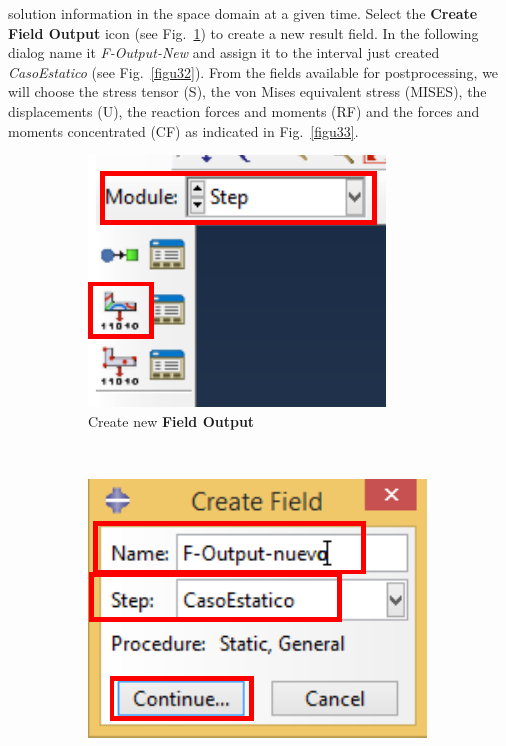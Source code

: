 \begin{enumerate}
  solution information in the space domain at a given time. Select the
  \textbf{Create Field Output} icon (see Fig.~\ref{figu31}) to create
  a new result field. In the following dialog name it
  \textit{F-Output-New} and assign it to the interval just created
  \textit{CasoEstatico} (see Fig.~\ref{figu32}). From the fields
  available for postprocessing, we will choose the stress tensor (S),
  the von Mises equivalent stress (MISES), the displacements (U), the
  reaction forces and moments (RF) and the forces and moments
  concentrated (CF) as indicated in Fig.~\ref{figu33}.
  \begin{figure}[H]
    \centering
    \begin{subfigure}{0.25\textwidth}
      \includegraphics[width=\textwidth]{./body/images/imagen31.pdf}
      \caption{Create new \textbf{Field Output}}
      \label{figu31}
    \end{subfigure}%
    ~ %
    \begin{subfigure}{0.33\textwidth}
      \includegraphics[width=\textwidth]{./body/images/imagen32.pdf}

\end{subfigure}
\end{figure}
\end{enumerate}
